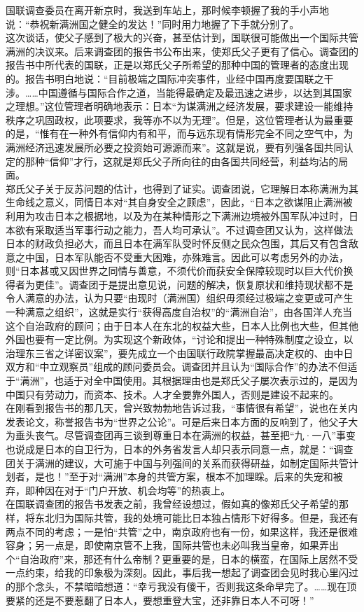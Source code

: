 国联调查委员在离开新京时，我送到车站上，那时候李顿握了我的手小声地说：“恭祝新满洲国之健全的发达！”同时用力地握了下手就分别了。\\

这次谈话，使父子感到了极大的兴奋，甚至估计到，国联很可能做出一个国际共管满洲的决议来。后来调查团的报告书公布出来，使郑氏父子更有了信心。调查团的报告书中所代表的国联，正是以郑氏父子所希望的那种中国的管理者的态度出现的。报告书明白地说：“目前极端之国际冲突事件，业经中国再度要国联之干涉。……中国遵循与国际合作之道，当能得最确定及最迅速之进步，以达到其国家之理想。”这位管理者明确地表示：日本“为谋满洲之经济发展，要求建设一能维持秩序之巩固政权，此项要求，我等亦不以为无理”。但是，这位管理者认为最重要的是，“惟有在一种外有信仰内有和平，而与远东现有情形完全不同之空气中，为满洲经济迅速发展所必要之投资始可源源而来”。这就是说，要有列强各国共同认定的那种“信仰”才行，这就是郑氏父子所向往的由各国共同经营，利益均沾的局面。\\

郑氏父子关于反苏问题的估计，也得到了证实。调查团说，它理解日本称满洲为其生命线之意义，同情日本对“其自身安全之顾虑”，因此，“日本之欲谋阻止满洲被利用为攻击日本之根据地，以及为在某种情形之下满洲边境被外国军队冲过时，日本欲有采取适当军事行动之能力，吾人均可承认”。不过调查团又认为，这样做法日本的财政负担必大，而且日本在满军队受时怀反侧之民众包围，其后又有包含敌意之中国，日本军队能否不受重大困难，亦殊难言。因此可以考虑另外的办法，则“日本甚或又因世界之同情与善意，不须代价而获安全保障较现时以巨大代价换得者为更佳”。调查团于是提出意见说，问题的解决，恢复原状和维持现状都不是令人满意的办法，认为只要“由现时（满洲国）组织毋须经过极端之变更或可产生一种满意之组织”，这就是实行“获得高度自治权”的“满洲自治”，由各国洋人充当这个自治政府的顾问；由于日本人在东北的权益大些，日本人比例也大些，但其他外国也要有一定比例。为实现这个新政体，“讨论和提出一种特殊制度之设立，以治理东三省之详密议案”，要先成立一个由国联行政院掌握最高决定权的、由中日双方和“中立观察员”组成的顾问委员会。调查团并且认为“国际合作”的办法不但适于“满洲”，也适于对全中国使用。其根据理由也是郑氏父子屡次表示过的，是因为中国只有劳动力，而资本、技术。人才全要靠外国人，否则是建设不起来的。\\

在刚看到报告书的那几天，曾兴致勃勃地告诉过我，“事情很有希望”，说也在关内发表论文，称誉报告书为“世界之公论”。可是后来日本方面的反响到了，他父子大为垂头丧气。尽管调查团再三谈到尊重日本在满洲的权益，甚至把“九·一八”事变也说成是日本的自卫行为，日本的外务省发言人却只表示同意一点，就是：“调查团关于满洲的建议，大可施于中国与列强间的关系而获得研益，如制定国际共管计划者，是也！”至于对“满洲”本身的共管方案，根本不加理睬。后来的失宠和被弃，即种因在对于“门户开放、机会均等”的热衷上。\\

在国联调查团的报告书发表之前，我曾经设想过，假如真的像郑氏父子希望的那样，将东北归为国际共管，我的处境可能比日本独占情形下好得多。但是，我还有两点不同的考虑；一是怕“共管”之中，南京政府也有一份，如果这样，我还是很难容身；另一点是，即使南京管不上我，国际共管也未必叫我当皇帝，如果弄出个“自治政府”来，那还有什么帝制？更重要的是，日本的横蛮，在国际上居然不受一点约束，给我的印象极为深刻。因此，事后我一想起了调查团会见时我心里闪过的那个念头，不禁暗暗想道：“幸亏我没有傻干，否则我这条命早完了。……现在顶要紧的还是不要惹翻了日本人，要想重登大宝，还非靠日本人不可呀！”